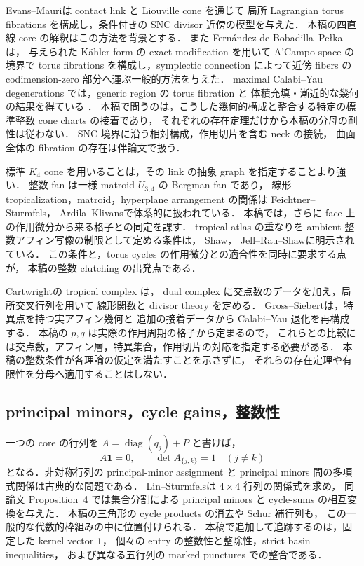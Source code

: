 Evans--Mauri\cite{EM}は contact link と Liouville cone を通じて
局所 Lagrangian torus fibrations を構成し，条件付きの SNC divisor 近傍の模型を与えた．
本稿の四直線 core の解釈はこの方法を背景とする．
また Fernández de Bobadilla--Pełka\cite[Theorem~6.14]{FernandezBobadillaPelka}は，
与えられた Kähler form の exact modification を用いて A'Campo space の境界で
torus fibrations を構成し，symplectic connection によって近傍 fibers の
codimension-zero 部分へ運ぶ一般的方法を与えた．
maximal Calabi--Yau degenerations では，generic region の torus fibration と
体積充填・漸近的な幾何の結果を得ている
\cite[Theorems~1.1--1.2]{FernandezBobadillaPelka}．
本稿で問うのは，こうした幾何的構成と整合する特定の標準整数 cone charts の接着であり，
それぞれの存在定理だけから本稿の分母の剛性は従わない．
SNC 境界に沿う相対構成，作用切片を含む neck の接続，
曲面全体の fibration の存在は伴論文\cite{SurfaceGeometry}で扱う．

標準 $K_4$ cone を用いることは，その link の抽象 graph を指定することより強い．
整数 fan は一様 matroid $U_{3,4}$ の Bergman fan であり，
線形 tropicalization，matroid，hyperplane arrangement の関係は
Feichtner--Sturmfels\cite{FeichtnerSturmfels}，
Ardila--Klivans\cite{ArdilaKlivans}で体系的に扱われている．
本稿では，さらに face 上の作用微分から来る格子との同定を課す．
tropical atlas の重なりを ambient 整数アフィン写像の制限として定める条件は，
Shaw\cite[Definition~3.1]{ShawSurfaces}，
Jell--Rau--Shaw\cite[Definitions~2.1 and~5.1]{JellRauShaw}に明示されている．
この条件と，torus cycles の作用微分との適合性を同時に要求する点が，
本稿の整数 clutching の出発点である．

Cartwright\cite[Definitions~2.5 and~2.8]{CartwrightComplexes}の tropical complex は，
dual complex に交点数のデータを加え，局所交叉行列を用いて
線形関数と divisor theory を定める．
Gross--Siebert\cite{GrossSiebert}は，特異点を持つ実アフィン幾何と
追加の接着データから Calabi--Yau 退化を再構成する．
本稿の $p,q$ は実際の作用周期の格子から定まるので，
これらとの比較には交点数，アフィン層，特異集合，作用切片の対応を指定する必要がある．
本稿の整数条件が各理論の仮定を満たすことを示さずに，
それらの存在定理や有限性を分母へ適用することはしない．

\subsection{principal minors，cycle gains，整数性}

一つの core の行列を $A=\operatorname{diag}(q_j)+P$ と書けば，
\[
 A\mathbf1=0,\qquad \det A_{\{j,k\}}=1\quad(j\ne k)
\]
となる．非対称行列の principal-minor assignment と
principal minors 間の多項式関係は古典的な問題である．
Lin--Sturmfels\cite{LinSturmfels}は $4\times4$ 行列の関係式を求め，
同論文 Proposition~4 では集合分割による principal minors と cycle-sums の相互変換を与えた．
本稿の三角形の cycle products の消去や Schur 補行列も，
この一般的な代数的枠組みの中に位置付けられる．
本稿で追加して追跡するのは，固定した kernel vector $\mathbf1$，
個々の entry の整数性と整除性，strict basin inequalities，
および異なる五行列の marked punctures での整合である．

